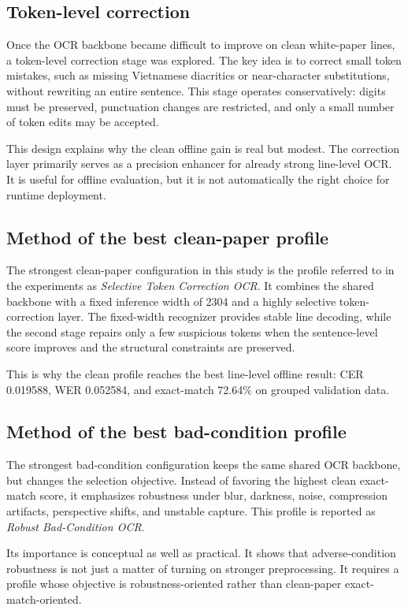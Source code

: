\documentclass[12pt,a4paper]{article}
\begin{document}
\subsection{Token-level correction}
Once the OCR backbone became difficult to improve on clean white-paper lines, a token-level correction stage was explored. The key idea is to correct small token mistakes, such as missing Vietnamese diacritics or near-character substitutions, without rewriting an entire sentence. This stage operates conservatively: digits must be preserved, punctuation changes are restricted, and only a small number of token edits may be accepted.

This design explains why the clean offline gain is real but modest. The correction layer primarily serves as a precision enhancer for already strong line-level OCR. It is useful for offline evaluation, but it is not automatically the right choice for runtime deployment.

\subsection{Method of the best clean-paper profile}
The strongest clean-paper configuration in this study is the profile referred to in the experiments as \emph{Selective Token Correction OCR}. It combines the shared backbone with a fixed inference width of 2304 and a highly selective token-correction layer. The fixed-width recognizer provides stable line decoding, while the second stage repairs only a few suspicious tokens when the sentence-level score improves and the structural constraints are preserved.

This is why the clean profile reaches the best line-level offline result: CER 0.019588, WER 0.052584, and exact-match 72.64\% on grouped validation data.

\subsection{Method of the best bad-condition profile}
The strongest bad-condition configuration keeps the same shared OCR backbone, but changes the selection objective. Instead of favoring the highest clean exact-match score, it emphasizes robustness under blur, darkness, noise, compression artifacts, perspective shifts, and unstable capture. This profile is reported as \emph{Robust Bad-Condition OCR}.

Its importance is conceptual as well as practical. It shows that adverse-condition robustness is not just a matter of turning on stronger preprocessing. It requires a profile whose objective is robustness-oriented rather than clean-paper exact-match-oriented.
\end{document}
